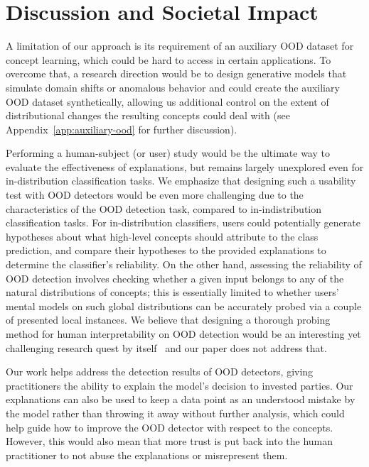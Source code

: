 \section{Discussion and Societal Impact}
\label{sec:app_discussion}
A limitation of our approach is its requirement of an auxiliary OOD dataset for concept learning, which could be hard to access in certain applications.
To overcome that, a research direction would be to design generative models that simulate domain shifts or anomalous behavior and could create the auxiliary OOD dataset synthetically, allowing us additional control on the extent of distributional changes the resulting concepts could deal with (see Appendix~\ref{app:auxiliary-ood} for further discussion). 


Performing a human-subject (or user) study would be the ultimate way to evaluate the effectiveness of explanations, but remains largely unexplored even for in-distribution classification tasks.  
We emphasize that designing such a usability test with OOD detectors would be even more challenging due to the characteristics of the OOD detection task, compared to in-indistribution classification tasks.
For in-distribution classifiers, users could potentially generate hypotheses about what high-level concepts should attribute to the class prediction, and compare their hypotheses to the provided explanations to determine the classifier's reliability.
On the other hand, assessing the reliability of OOD detection involves checking whether a given input belongs to any of the natural distributions of concepts; this is essentially limited to whether users' mental models on such global distributions can be accurately probed via a couple of presented local instances.
We believe that designing a thorough probing method for human interpretability on OOD detection would be an interesting yet challenging research quest by itself~\cite{kim2022hive} and our paper does not address that.

\label{sec:broader_impact}
Our work helps address the detection results of OOD detectors, giving practitioners the ability to explain the model's decision to invested parties. 
Our explanations can also be used to keep a data point as an understood mistake by the model rather than throwing it away without further analysis, which could help guide how to improve the OOD detector with respect to the concepts. 
However, this would also mean that more trust is put back into the human practitioner to not abuse the explanations or misrepresent them. 
